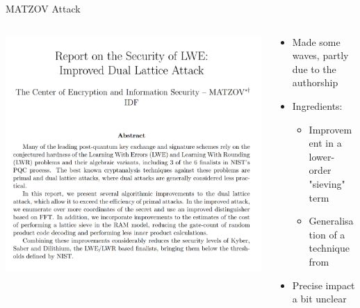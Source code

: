 \documentclass[xcolor=table,10pt,aspectratio=169]{beamer}
\begin{document}
\begin{frame}[label={sec:org5169910}]{MATZOV Attack}
\begin{columns}[t]
\begin{column}{0.6\columnwidth}
\begin{center}
\includegraphics[keepaspectratio,height=.8\textheight]{./matzov.png}
\end{center}
\end{column}

\begin{column}{0.4\columnwidth}
\begin{itemize}
\item Made some waves, partly due to the authorship
\item Ingredients:
\begin{itemize}
\item Improvement in a lower-order "sieving" term
\item Generalisation of a technique from \cite{AC:GuoJoh21}
\end{itemize}
\item Precise impact a bit unclear 
\end{itemize}
\end{column}
\end{columns}
\end{frame}
\end{document}
